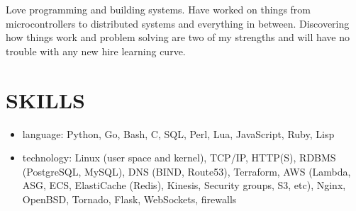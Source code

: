 \documentclass{res}
\begin{document}
\address{john@jjdev.com - (714) 895 6311 - Westminster, CA 92683}

\begin{resume}
    Love programming and building systems. Have worked on things
    from microcontrollers to distributed systems and everything in
    between. Discovering how things work and problem solving are two of my
    strengths and will have no trouble with any new hire learning curve.
\section{SKILLS}
\begin{itemize}
  \item
    language: Python, Go, Bash, C, SQL, Perl, Lua, JavaScript, Ruby, Lisp
  \item
    technology: Linux (user space and kernel), TCP/IP, HTTP(S),
    RDBMS (PostgreSQL, MySQL), DNS (BIND, Route53), Terraform, AWS
    (Lambda, ASG, ECS, ElastiCache (Redis), Kinesis, Security groups,
    S3, etc), Nginx, OpenBSD, Tornado, Flask, WebSockets, firewalls
  \end{itemize}

\end{resume}
\end{document}
